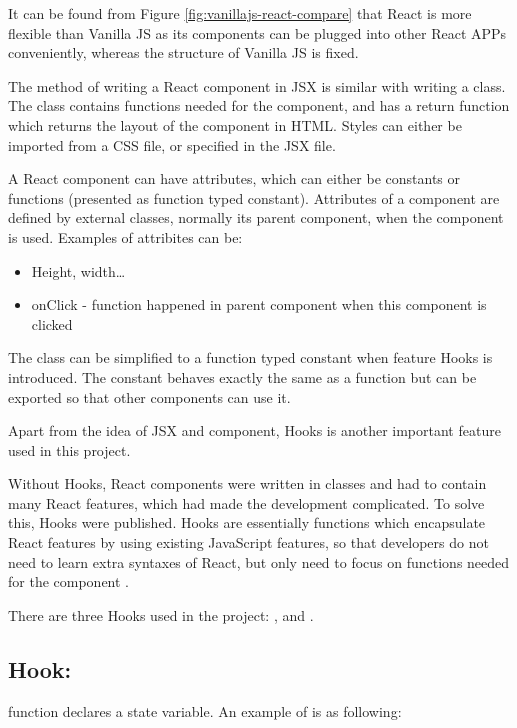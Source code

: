 \documentclass[12pt,twoside]{report}
\begin{document}
It can be found from Figure \ref{fig:vanillajs-react-compare} that React is more flexible than Vanilla JS as its components can be plugged into other React APPs conveniently, whereas the structure of Vanilla JS is fixed.

The method of writing a React component in JSX is similar with writing a class.
The class contains functions needed for the component, and has a return function
which returns the layout of the component in HTML. Styles can either be imported
from a CSS file, or specified in the JSX file.

A React component can have attributes, which can either be constants or functions (presented as function typed constant). Attributes of a component are defined by external classes, normally its parent component, when the component is used. Examples of attribites can be:
\begin{itemize}
    \item Height, width\dots
    \item onClick - function happened in parent component when this component is clicked
\end{itemize}

The class can be simplified to a function typed constant when feature Hooks is
introduced. The constant behaves exactly the same as a function but can be
exported so that other components can use it.

Apart from the idea of JSX and component, Hooks is another important feature used in this project.

Without Hooks, React components were written in classes and had to contain many
React features, which had made the development complicated. To solve this, Hooks
were published. Hooks are essentially functions which encapsulate React features
by using existing JavaScript features, so that developers do not need to learn
extra syntaxes of React, but only need to focus on functions needed for the
component \cite{reacthooksbook}.

There are three Hooks used in the project: ,  and .

\subsection*{Hook: }
\label{subsec:useState}
 function declares a state variable. An example of  is as following:

\centerline{}
\end{document}

